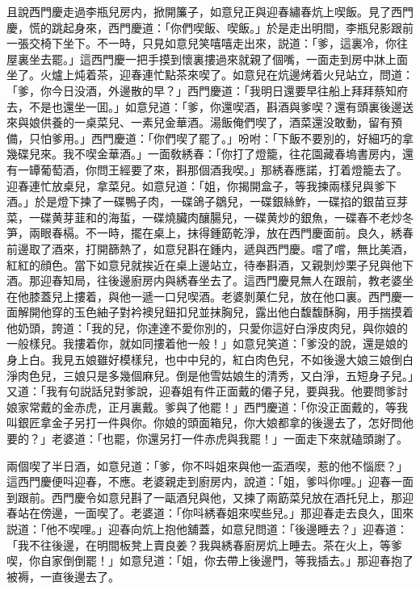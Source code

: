 且說西門慶走過李瓶兒房内，掀開簾子，如意兒正與迎春繡春炕上喫飯。見了西門慶，慌的跳起身來，西門慶道：「你們喫飯、喫飯。」於是走出明間，李瓶兒影跟前一張交椅下坐下。不一時，只見如意兒笑嘻嘻走出來，説道：「爹，這裏冷，你往屋裏坐去罷。」這西門慶一把手摸到懷裏摟過來就親了個嘴，一面走到房中牀上面坐了。火爐上炖着茶，迎春連忙點茶來喫了。如意兒在炕邊烤着火兒站立，問道：「爹，你今日没酒，外邊散的早？」西門慶道：「我明日還要早往船上拜拜蔡知府去，不是也還坐一囬。」如意兒道：「爹，你還喫酒，斟酒與爹喫？還有頭裏後邊送來與娘供養的一桌菜兒、一素兒金華酒。湯飯俺們喫了，酒菜還没敢動，留有預備，只怕爹用。」西門慶道：「你們喫了罷了。」吩咐：「下飯不要別的，好細巧的拿幾碟兒來。我不喫金華酒。」一面敎綉春：「你打了燈籠，往花園藏春塢書房内，還有一罈葡萄酒，你問王經要了來，斟那個酒我喫。」那綉春應諾，打着燈籠去了。迎春連忙放桌兒，拿菜兒。如意兒道：「姐，你揭開盒子，等我揀兩樣兒與爹下酒。」於是燈下揀了一碟鴨子肉，一碟鴿子鶵兒，一碟銀絲鮓，一碟掐的銀苗豆芽菜，一碟黄芽韮和的海蜇，一碟燒臟肉釀腸兒，一碟黄炒的銀魚，一碟春不老炒冬笋，兩眼春槅。不一時，擺在桌上，抹得鍾筯乾淨，放在西門慶面前。良久，綉春前邊取了酒來，打開篩熱了，如意兒斟在鍾内，遞與西門慶。嚐了嚐，無比美酒，紅紅的顔色。當下如意兒就挨近在桌上邊站立，待奉斟酒，又親剝炒栗子兒與他下酒。那迎春知局，往後邊廚房内與綉春坐去了。這西門慶見無人在跟前，教老婆坐在他膝蓋兒上摟着，與他一遞一口兒喫酒。老婆剝菓仁兒，放在他口裏。西門慶一面解開他穿的玉色紬子對衿襖兒鈕扣兒並抹胸兒，露出他白馥馥酥胸，用手揣摸着他奶頭，誇道：「我的兒，你達達不愛你別的，只愛你這好白淨皮肉兒，與你娘的一般樣兒。我摟着你，就如同摟着他一般！」如意兒笑道：「爹没的說，還是娘的身上白。我見五娘雖好模樣兒，也中中兒的，紅白肉色兒，不如後邊大娘三娘倒白淨肉色兒，三娘只是多幾個麻兒。倒是他雪姑娘生的清秀，又白淨，五短身子兒。」又道：「我有句説話兒對爹說，迎春姐有件正面戴的僊子兒，要與我。他要問爹討娘家常戴的金赤虎，正月裏戴。爹與了他罷！」西門慶道：「你没正面戴的，等我叫銀匠拿金子另打一件與你。你娘的頭面箱兒，你大娘都拿的後邊去了，怎好問他要的？」老婆道：「也罷，你還另打一件赤虎與我罷！」一面走下來就磕頭謝了。

兩個喫了半日酒，如意兒道：「爹，你不呌姐來與他一盃酒喫，惹的他不惱麽？」這西門慶便呌迎春，不應。老婆親走到廚房内，說道：「姐，爹呌你哩。」迎春一面到跟前。西門慶令如意兒斟了一甌酒兒與他，又揀了兩筯菜兒放在酒托兒上，那迎春站在傍邊，一面喫了。老婆道：「你呌綉春姐來喫些兒。」那迎春走去良久，囬來説道：「他不喫哩。」迎春向炕上抱他舖蓋，如意兒問道：「後邊睡去？」迎春道：「我不往後邊，在明間板凳上賣良姜？我與綉春廚房炕上睡去。茶在火上，等爹喫，你自家倒倒罷！」如意兒道：「姐，你去帶上後邊門，等我插去。」那迎春抱了被褥，一直後邊去了。

